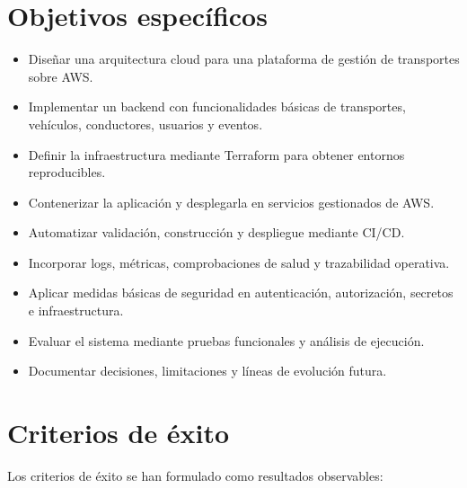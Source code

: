 \section{Objetivos específicos}
\label{sec:objetivos-especificos}

\begin{itemize}
  \item Diseñar una arquitectura cloud para una plataforma de gestión de transportes sobre AWS.
  \item Implementar un backend con funcionalidades básicas de transportes, vehículos, conductores, usuarios y eventos.
  \item Definir la infraestructura mediante Terraform para obtener entornos reproducibles.
  \item Contenerizar la aplicación y desplegarla en servicios gestionados de AWS.
  \item Automatizar validación, construcción y despliegue mediante CI/CD.
  \item Incorporar logs, métricas, comprobaciones de salud y trazabilidad operativa.
  \item Aplicar medidas básicas de seguridad en autenticación, autorización, secretos e infraestructura.
  \item Evaluar el sistema mediante pruebas funcionales y análisis de ejecución.
  \item Documentar decisiones, limitaciones y líneas de evolución futura.
\end{itemize}

\section{Criterios de éxito}
\label{sec:criterios-exito}

Los criterios de éxito se han formulado como resultados observables:

